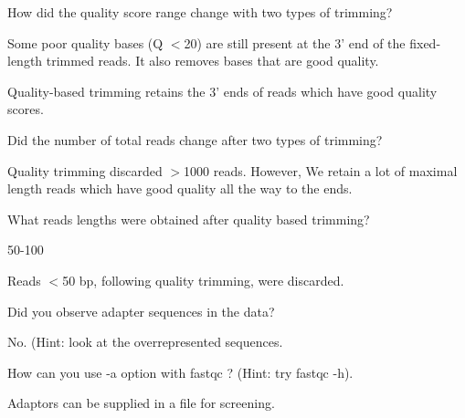 \begin{questions}
How did the quality score range change with two types of trimming?
\begin{answer}
Some poor quality bases (Q $<$20) are still present at the 3' end of the
fixed-length trimmed reads. It also removes bases that are good quality.

Quality-based trimming retains the 3' ends of reads which have good quality
scores.
\end{answer}

Did the number of total reads change after two types of trimming?
\begin{answer}
Quality trimming discarded $>$1000 reads. However, We retain a lot of maximal
length reads which have good quality all the way to the ends.
\end{answer}

What reads lengths were obtained after quality based trimming?
\begin{answer}
50-100

Reads $<$50 bp, following quality trimming, were discarded.
\end{answer}

Did you observe adapter sequences in the data?
\begin{answer}
No. (Hint: look at the overrepresented sequences.
\end{answer}

How can you use -a option with fastqc ? (Hint: try fastqc -h).
\begin{answer}
Adaptors can be supplied in a file for screening.
\end{answer}
\end{questions}


